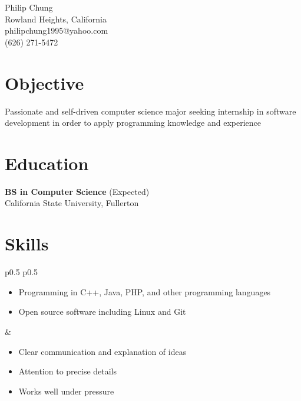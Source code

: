 \documentclass[10pt]{article}
\newcommand{\baseheader}[3]{#1 \marginpar{\raggedleft #2} \\ #3}
\begin{document}
	\begin{center}
		{\LARGE Philip Chung} \\
		Rowland Heights, California \\
		philipchung1995@yahoo.com \\
		(626) 271-5472 \\
	\end{center}

	\section*{Objective}

	Passionate and self-driven computer science major seeking internship in software development in order to apply programming knowledge and experience

	\section*{Education}

	\baseheader{\textbf{BS in Computer Science} (Expected)}{1/2018}{California State University, Fullerton}

	\section*{Skills}

	\begin{tabular}{p{0.5\textwidth} p{0.5\textwidth}}
		\begin{minipage}[t]{\linewidth}
			\raggedright
			\begin{itemize}[nosep]
				\item Programming in C++, Java, PHP, and other programming languages
				\item Open source software including Linux and Git
			\end{itemize}
		\end{minipage}
		&
		\begin{minipage}[t]{\linewidth}
			\raggedright
			\begin{itemize}[nosep]
				\item Clear communication and explanation of ideas
				\item Attention to precise details
				\item Works well under pressure
			\end{itemize}
		\end{minipage}
	\end{tabular}
\end{document}
